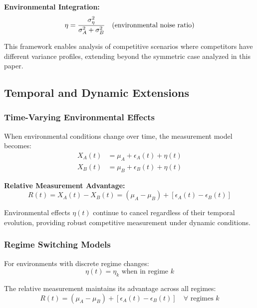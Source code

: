 \textbf{Environmental Integration:}
\begin{equation}
\eta = \frac{\sigma_\eta^2}{\sigma_A^2 + \sigma_B^2} \quad \text{(environmental noise ratio)}
\end{equation}

This framework enables analysis of competitive scenarios where competitors have different variance profiles, extending beyond the symmetric case analyzed in this paper.

\subsection{Temporal and Dynamic Extensions}

\subsubsection{Time-Varying Environmental Effects}

When environmental conditions change over time, the measurement model becomes:
\begin{align}
X_A(t) &= \mu_A + \epsilon_A(t) + \eta(t) \\
X_B(t) &= \mu_B + \epsilon_B(t) + \eta(t)
\end{align}

\textbf{Relative Measurement Advantage:}
\begin{equation}
R(t) = X_A(t) - X_B(t) = (\mu_A - \mu_B) + [\epsilon_A(t) - \epsilon_B(t)]
\end{equation}

Environmental effects $\eta(t)$ continue to cancel regardless of their temporal evolution, providing robust competitive measurement under dynamic conditions.

\subsubsection{Regime Switching Models}

For environments with discrete regime changes:
\begin{equation}
\eta(t) = \eta_k \text{ when in regime } k
\end{equation}

The relative measurement maintains its advantage across all regimes:
\begin{equation}
R(t) = (\mu_A - \mu_B) + [\epsilon_A(t) - \epsilon_B(t)] \quad \forall \text{ regimes } k
\end{equation}

